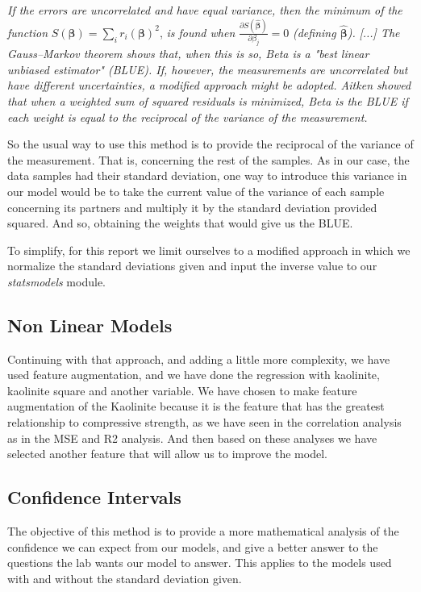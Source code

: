 \documentclass[10pt,conference,compsocconf]{IEEEtran}
\begin{document}
\textit{If the errors are uncorrelated and have equal variance, then the minimum of the function}
\newline
$
S({\boldsymbol{\beta }})=\sum_{i}{r_{i}({\boldsymbol{\beta }})^{2}}
$,
\textit{is found when}
$
\displaystyle{\frac{\partial S({\hat {\boldsymbol {\beta }}})}{\partial \beta _{j}}}=0
$
\textit{(defining ${\displaystyle {\boldsymbol {\hat {\beta }}}}$). }
\newline
\newline
\textit{[...] The Gauss–Markov theorem shows that, when this is so, Beta is a "best linear unbiased estimator" (BLUE). If, however, the measurements are uncorrelated but have different uncertainties, a modified approach might be adopted. Aitken showed that when a weighted sum of squared residuals is minimized, Beta is the BLUE if each weight is equal to the reciprocal of the variance of the measurement.}\cite{wiki:wls}

So the usual way to use this method is to provide the reciprocal of the variance of the measurement. That is, concerning the rest of the samples. As in our case, the data samples had their standard deviation,  one way to introduce this variance in our model would be to take the current value of the variance of each sample concerning its partners and multiply it by the standard deviation provided squared. And so, obtaining the weights that would give us the BLUE. 

To simplify, for this report we limit ourselves to a modified approach in which we normalize the standard deviations given and input the inverse value to our \textit{statsmodels} module.

\subsection{Non Linear Models}
Continuing with that approach, and adding a little more complexity, we have used feature augmentation, and we have done the regression with kaolinite, kaolinite square and another variable. We have chosen to make feature augmentation of the Kaolinite because it is the feature that has the greatest relationship to compressive strength, as we have seen in the correlation analysis as in the MSE and R2 analysis.  And then based on these analyses we have selected another feature that will allow us to improve the model.
\subsection{Confidence Intervals}
The objective of this method is to provide a more mathematical analysis of the confidence we can expect from our models, and give a better answer to the questions the lab wants our model to answer. This applies to the models used with and without the standard deviation given.
\end{document}
